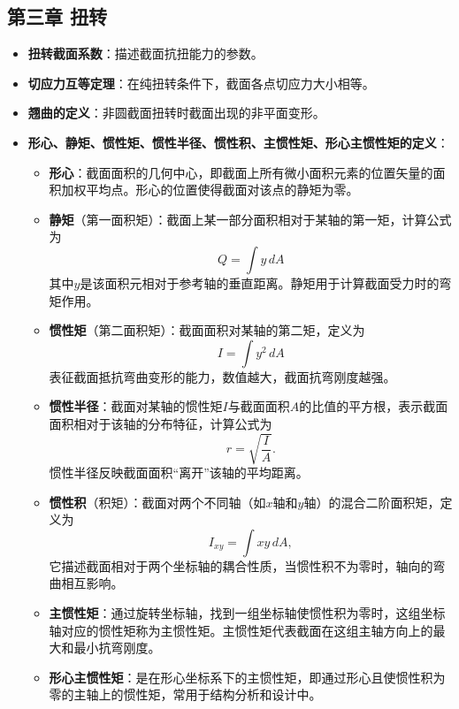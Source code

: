 \documentclass[12pt,a4paper]{article}
\begin{document}
\subsection*{第三章 扭转}
\begin{itemize}
  \item \textbf{扭转截面系数}：描述截面抗扭能力的参数。
  \item \textbf{切应力互等定理}：在纯扭转条件下，截面各点切应力大小相等。
  \item \textbf{翘曲的定义}：非圆截面扭转时截面出现的非平面变形。
  \item \textbf{形心、静矩、惯性矩、惯性半径、惯性积、主惯性矩、形心主惯性矩的定义}：
    \begin{itemize}
  \item \textbf{形心}：截面面积的几何中心，即截面上所有微小面积元素的位置矢量的面积加权平均点。形心的位置使得截面对该点的静矩为零。
  \item \textbf{静矩}（第一面积矩）：截面上某一部分面积相对于某轴的第一矩，计算公式为
  \[
    Q = \int y \, dA
  \]
  其中$y$是该面积元相对于参考轴的垂直距离。静矩用于计算截面受力时的弯矩作用。
  \item \textbf{惯性矩}（第二面积矩）：截面面积对某轴的第二矩，定义为
  \[
    I = \int y^2 \, dA
  \]
  表征截面抵抗弯曲变形的能力，数值越大，截面抗弯刚度越强。
  \item \textbf{惯性半径}：截面对某轴的惯性矩$I$与截面面积$A$的比值的平方根，表示截面面积相对于该轴的分布特征，计算公式为
  \[
    r = \sqrt{\frac{I}{A}}.
  \]
  惯性半径反映截面面积“离开”该轴的平均距离。
  \item \textbf{惯性积}（积矩）：截面对两个不同轴（如$x$轴和$y$轴）的混合二阶面积矩，定义为
  \[
    I_{xy} = \int xy \, dA,
  \]
  它描述截面相对于两个坐标轴的耦合性质，当惯性积不为零时，轴向的弯曲相互影响。
  \item \textbf{主惯性矩}：通过旋转坐标轴，找到一组坐标轴使惯性积为零时，这组坐标轴对应的惯性矩称为主惯性矩。主惯性矩代表截面在这组主轴方向上的最大和最小抗弯刚度。
  \item \textbf{形心主惯性矩}：是在形心坐标系下的主惯性矩，即通过形心且使惯性积为零的主轴上的惯性矩，常用于结构分析和设计中。
\end{itemize}
\end{itemize}
\end{document}
